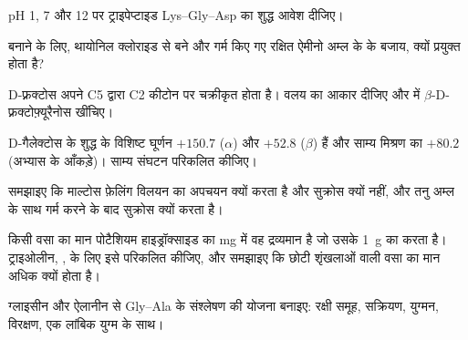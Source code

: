 \begin{exercise}[$\star\star$]\label{exo:b2:biomolecules:5}
pH 1, 7 और 12 पर ट्राइपेप्टाइड Lys--Gly--Asp का शुद्ध आवेश दीजिए।
\end{exercise}

\begin{exercise}[$\star\star$]\label{exo:b2:biomolecules:6}
 बनाने के लिए, थायोनिल क्लोराइड से बने और गर्म किए गए रक्षित ऐमीनो
अम्ल के  के बजाय,  क्यों प्रयुक्त होता है?
\end{exercise}

\begin{exercise}[$\star\star$]\label{exo:b2:biomolecules:7}
D-फ़्रक्टोस अपने C5  द्वारा C2 कीटोन पर चक्रीकृत होता है। वलय का आकार दीजिए और
 में $\beta$-D-फ़्रक्टोफ़्यूरैनोस खींचिए।
\end{exercise}

\begin{exercise}[$\star\star$]\label{exo:b2:biomolecules:8}
D-गैलेक्टोस के शुद्ध  के विशिष्ट घूर्णन $+150.7$ ($\alpha$) और $+52.8$ ($\beta$) हैं और
साम्य मिश्रण का $+80.2$ (अभ्यास के आँकड़े)। साम्य संघटन परिकलित कीजिए।
\end{exercise}

\begin{exercise}[$\star\star$]\label{exo:b2:biomolecules:9}
समझाइए कि माल्टोस फ़ेलिंग विलयन का अपचयन क्यों करता है और सुक्रोस क्यों नहीं, और तनु अम्ल के साथ गर्म करने के
बाद सुक्रोस क्यों करता है।
\end{exercise}

\begin{exercise}[$\star\star\star$]\label{exo:b2:biomolecules:10}
किसी वसा का  मान पोटैशियम हाइड्रॉक्साइड का mg में वह द्रव्यमान है जो उसके 1~g का  करता है।
ट्राइओलीन, , के लिए इसे परिकलित कीजिए, और समझाइए कि छोटी शृंखलाओं वाली वसा का मान अधिक क्यों होता है।
\end{exercise}

\begin{exercise}[$\star\star\star$]\label{exo:b2:biomolecules:11}
ग्लाइसीन और ऐलानीन से Gly--Ala के संश्लेषण की योजना बनाइए: रक्षी समूह, सक्रियण, युग्मन,
विरक्षण, एक लांबिक युग्म के साथ।
\end{exercise}

